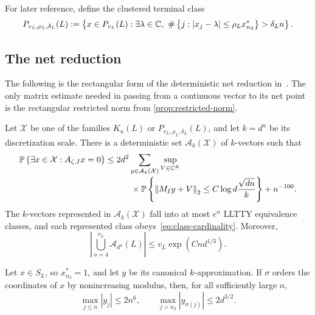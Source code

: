 For later reference, define the clustered terminal class
\begin{equation}\label{eq:clustered-Pv}
  P_{v_L,\rho_L,\delta_L}(L)
  :=\set{x\in P_{v_L}(L):\exists\lambda\in\C,\ 
  \#\set{j:|x_j-\lambda|\le\rho_Lx_{n_3}^*}>\delta_Ln}.
\end{equation}

\subsection{The net reduction}

The following is the rectangular form of the deterministic net reduction in~\cite[Sections~5--7]{LLTTY19}. The only matrix estimate needed in passing from a continuous vector to its net point is the rectangular restricted norm from 
\cref{prop:restricted-norm}.

\begin{lemma}\label{lem:net-reduction}
Let $\mathcal X$ be one of the families $K_u(L)$ or $P_{v_L,\rho_L,\delta_L}(L)$, and let $k=d^u$ be its discretization scale. There is a deterministic set $\mathcal A_k(\mathcal X)$ of $k$-vectors such that
\begin{equation}\label{eq:net-reduction}
  \begin{aligned}
  \mathbb P\left\{\exists x\in\mathcal X:A_{\zeta,I}x=0\right\}
  &\le2d^2\sum_{y\in\mathcal A_k(\mathcal X)}
  \sup_{V\in\mathbb C^K}\\[-2pt]
  &\hspace{3em}\times
  \mathbb P\left\{\left\|M_Iy+V\right\|_2\le C\log d\frac{\sqrt{dn}}{k}\right\}
  +n^{-100}.
  \end{aligned}
\end{equation}
The $k$-vectors represented in $\mathcal A_k(\mathcal X)$ fall into at most $e^n$ LLTTY equivalence classes, and each represented class obeys~\eqref{eq:class-cardinality}. Moreover,
\begin{equation}\label{eq:crude-net-count}
  \left|\bigcup_{u=4}^{v_L}\mathcal A_{d^u}(L)\right|
  \le v_L\exp(Cnd^{1/3}).
\end{equation}
\end{lemma}

\begin{lemmafiveonea}\label{lem:coordinate-ranges}
Let $x\in S_L$, so $x_{n_3}^*=1$, and let $y$ be its canonical $k$-approximation. If $\sigma$ orders the coordinates of $x$ by nonincreasing modulus, then, for all sufficiently large $n$,
\[
  \max_{j\le n}|y_j|\le2n^6,
  \qquad
  \max_{j>n_2}|y_{\sigma(j)}|\le2d^{3/2}.
\]
\end{lemmafiveonea}

